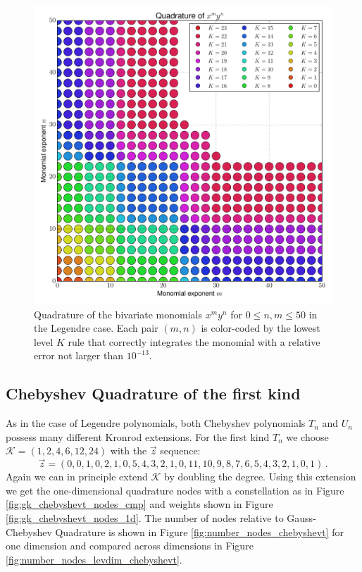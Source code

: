 \documentclass[a4paper,10pt]{article}
\begin{document}
\begin{figure}
  \centering
  \includegraphics[width=\linewidth]{./img/monomial_errors_legendre_2D.pdf}
  \caption{Quadrature of the bivariate monomials $x^m y^n$ for $0 \leq n, m \leq 50$
  in the Legendre case.
  Each pair $(m,n)$ is color-coded by the lowest level $K$ rule that correctly
  integrates the monomial with a relative error not larger than $10^{-13}$.}
  \label{fig:monomial_errors_legendre_2D}
\end{figure}

\FloatBarrier
\subsection{Chebyshev Quadrature of the first kind}

As in the case of Legendre polynomials, both Chebyshev polynomials $T_n$
and $U_n$ possess many different Kronrod extensions. For the first kind $T_n$
we choose $\mathcal{K} = (1, 2, 4, 6, 12, 24)$ with the $\vec{z}$ sequence:
\begin{equation*}
  \vec{z} = (0, 0, 1, 0, 2, 1, 0, 5, 4, 3, 2, 1, 0, 11, 10, 9, 8, 7, 6, 5, 4, 3, 2, 1, 0, 1) \,.
\end{equation*}
Again we can in principle extend $\mathcal{K}$ by doubling the degree.
Using this extension we get the one-dimensional quadrature nodes
with a constellation as in Figure \ref{fig:gk_chebyshevt_nodes_cmp}
and weights shown in Figure \ref{fig:gk_chebyshevt_nodes_1d}.
The number of nodes relative to Gauss-Chebyshev Quadrature is shown
in Figure \ref{fig:number_nodes_chebyshevt} for one dimension and
compared across dimensions in Figure \ref{fig:number_nodes_levdim_chebyshevt}.
\end{document}
